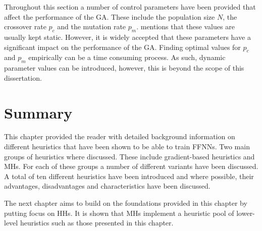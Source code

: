 Throughout this section a number of control parameters have been provided that affect the performance of the \ac{GA}. These include the population size $N$, the crossover rate $p_{c}$ and the mutation rate $p_{m}$. \citeauthor{ref:engelbrecht:2007}\cite{ref:engelbrecht:2007} mentions that these values are usually kept static. However, it is widely accepted that these parameters have a significant impact on the performance of the \ac{GA}.  Finding optimal values for $p_{c}$ and  $p_{m}$ empirically can be a time consuming process. As such, dynamic parameter values can be introduced, however, this is beyond the scope of this dissertation.


\section{Summary}
\label{sec:heuristics:summary}

This chapter provided the reader with detailed background information on different heuristics that have been shown to be able to train \acp{FFNN}. Two main groups of heuristics where discussed. These include gradient-based heuristics and \aclp{MH}. For each of these groups a number of different variants have been discussed. A total of ten different heuristics have been introduced and where possible, their advantages, disadvantages and characteristics have been discussed.

The next chapter aims to build on the foundations provided in this chapter by putting focus on \acp{HH}. It is shown that \acp{MH} implement a heuristic pool of lower-level heuristics such as those presented in this chapter.










